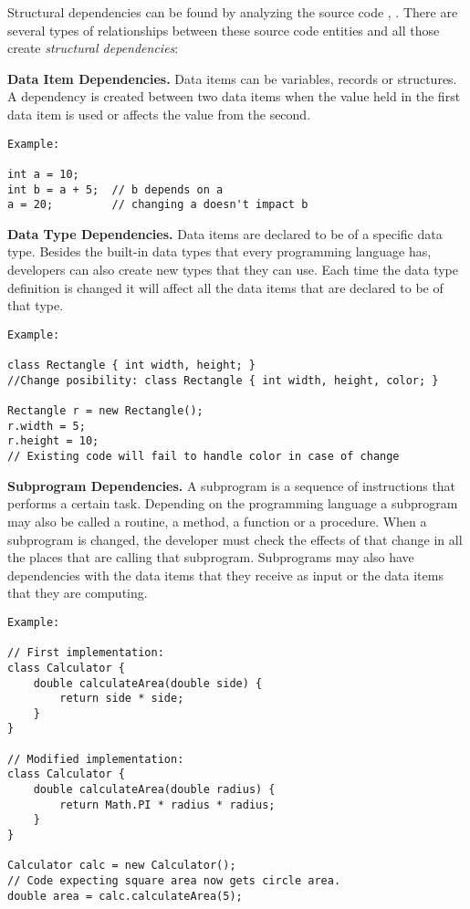 Structural dependencies can be found by analyzing the source code \cite{Sangal:2005:UDM:1094811.1094824}, \cite{CalloArias2011}. 
There are several types of relationships between these source code entities and all those create \textit{structural dependencies}:

\textbf{Data Item Dependencies.}
Data items can be variables, records or structures. A dependency is created between two data items when the value held in the first data item is used or affects the value from the second.


\begin{verbatim}
Example:

int a = 10;
int b = a + 5;  // b depends on a
a = 20;         // changing a doesn't impact b
\end{verbatim}

\textbf{Data Type Dependencies.}
Data items are declared to be of a specific data type. Besides the built-in data types that every programming language has, developers can also create new types that they can use. Each time the data type definition is changed it will affect all the data items that are declared to be of that type. 


\begin{verbatim}
Example:

class Rectangle { int width, height; }
//Change posibility: class Rectangle { int width, height, color; }

Rectangle r = new Rectangle();  
r.width = 5;
r.height = 10;
// Existing code will fail to handle color in case of change
\end{verbatim}

\textbf{Subprogram Dependencies.}
A subprogram is a sequence of instructions that performs a certain task. Depending on the programming language a subprogram may also be called a routine, a method, a function or a procedure. When a subprogram is changed, the developer must check the effects of that change in all the places that are calling that subprogram. Subprograms may also have dependencies with the data items that they receive as input or the data items that they are computing.


\begin{verbatim}
Example:

// First implementation:
class Calculator {
    double calculateArea(double side) {
        return side * side;  
    }
}

// Modified implementation:
class Calculator {
    double calculateArea(double radius) {
        return Math.PI * radius * radius; 
    }
}

Calculator calc = new Calculator();
// Code expecting square area now gets circle area.
double area = calc.calculateArea(5);  

\end{verbatim}





